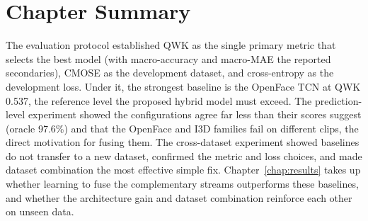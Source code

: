 \documentclass[../main.tex]{subfiles}
\begin{document}
\FloatBarrier
\section{Chapter Summary}
\label{sec:baseline-summary}

The evaluation protocol established QWK as the single primary metric that selects the best model (with macro-accuracy and macro-MAE the reported secondaries), CMOSE as the development dataset, and cross-entropy as the development loss. Under it, the strongest baseline is the OpenFace TCN at QWK 0.537, the reference level the proposed hybrid model must exceed. The prediction-level experiment showed the configurations agree far less than their scores suggest (oracle 97.6\%) and that the OpenFace and I3D families fail on different clips, the direct motivation for fusing them. The cross-dataset experiment showed baselines do not transfer to a new dataset, confirmed the metric and loss choices, and made dataset combination the most effective simple fix. Chapter~\ref{chap:results} takes up whether learning to fuse the complementary streams outperforms these baselines, and whether the architecture gain and dataset combination reinforce each other on unseen data.
\end{document}
